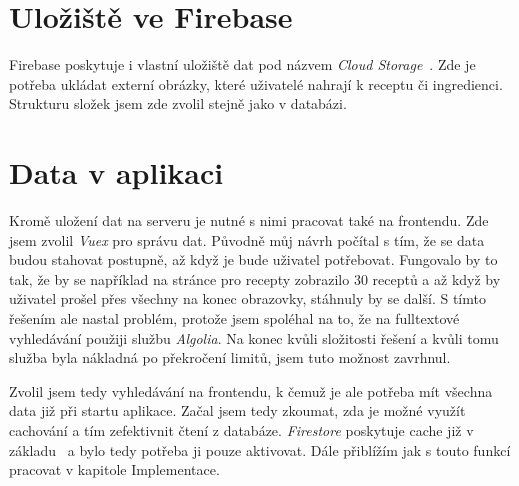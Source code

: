 
\section{Uložiště ve Firebase}
Firebase poskytuje i vlastní uložiště dat pod názvem \emph{Cloud Storage}~\cite{CloudStorage}. Zde je potřeba ukládat externí obrázky, které uživatelé
nahrají k receptu či ingredienci. Strukturu složek jsem zde zvolil stejně jako v databázi.

\section{Data v aplikaci}
Kromě uložení dat na serveru je nutné s nimi pracovat také na frontendu. Zde jsem zvolil \emph{Vuex} pro správu dat. Původně
můj návrh počítal s tím, že se data budou stahovat postupně, až když je bude uživatel potřebovat. Fungovalo by to tak, že by
se například na stránce pro recepty zobrazilo 30 receptů a až když by uživatel prošel přes všechny na konec obrazovky, stáhnuly
by se další. S tímto řešením ale nastal problém, protože jsem spoléhal na to, že na fulltextové vyhledávání použiji službu
\emph{Algolia}. Na konec kvůli složitosti řešení a kvůli tomu služba byla nákladná po překročení limitů, jsem tuto možnost zavrhnul.

Zvolil jsem tedy vyhledávání na frontendu, k čemuž je ale potřeba mít všechna data již při startu aplikace. Začal jsem tedy
zkoumat, zda je možné využít cachování a tím zefektivnit čtení z databáze. \emph{Firestore} poskytuje cache již v základu~\cite{FirestoreCache} a bylo
tedy potřeba ji pouze aktivovat. Dále přiblížím jak s touto funkcí pracovat v kapitole Implementace.

